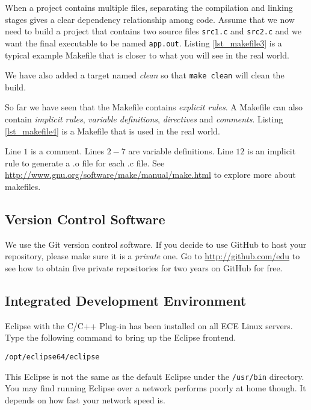 

When a project contains multiple files, separating the compilation and linking stages gives a clear dependency relationship among code. Assume that we now need to build a project that contains two source files \verb+src1.c+ and \verb+src2.c+ and we want the final executable to be named \verb+app.out+.
Listing \ref{lst_makefile3} is a typical example Makefile that is closer to what you will see in the real world.

We have also added a target named {\em clean} so that \verb+make clean+ will clean the build.

So far we have seen that the Makefile contains {\em explicit rules}. A Makefile can also contain {\em implicit rules}, {\em variable definitions}, {\em directives} and
{\em comments}. 
Listing \ref{lst_makefile4} is a Makefile that is used in the real world.

Line $1$ is a comment. Lines $2-7$ are variable definitions. Line $12$ is an implicit rule to generate a .o file for each .c file. 
See \url{http://www.gnu.org/software/make/manual/make.html} to explore more about makefiles.

\subsection{Version Control Software}
We use the Git version control software. If you decide to use GitHub to host your repository, please make sure it is a {\em private} one. Go to \url{http://github.com/edu} to see how to obtain five private repositories for two years on GitHub for free. 


\subsection{Integrated Development Environment}
Eclipse with the C/C++ Plug-in has been installed on all ECE Linux servers. Type the following command to bring up the Eclipse frontend.
\begin{lstlisting}[style=bash]
/opt/eclipse64/eclipse
\end{lstlisting}
This Eclipse is not the same as the default Eclipse under the \verb+/usr/bin+ directory. You may find running Eclipse over a network performs poorly at home though. It depends on how fast your network speed is. 

